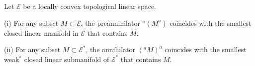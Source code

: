 Let $\mathcal{E}$ be a locally convex topological linear space.

(i) For any subset $M \subset \mathcal{E}$, the preannihilator $^a(M^a)$ coincides with the smallest closed linear manifold in $\mathcal{E}$ that contains $M$.

(ii) For any subset $M \subset \mathcal{E}^*$, the annihilator $(^a M)^a$ coincides with the smallest weak$^*$ closed linear submanifold of $\mathcal{E}^*$ that contains $M$.

